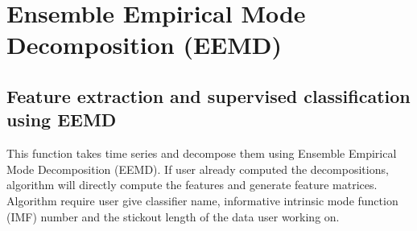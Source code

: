 \documentclass[letterpaper,10pt,english]{sphinxmanual}
\begin{document}
\begin{fulllineitems}
\begin{quote}
\begin{description}
\begin{sphinxVerbatim}[commandchars=\\\{\}]
   
                                            
\PYGZbs{}\PYGZbs{}\PYGZbs{}
\PYGZbs{}\PYGZbs{}\PYGZbs{}
\PYGZbs{}\PYGZbs{}\PYGZbs{}   
\PYGZbs{}\PYGZbs{}\PYGZbs{}
\end{sphinxVerbatim}

\end{description}\end{quote}

\end{fulllineitems}



\chapter{Ensemble Empirical Mode Decomposition (EEMD)}
\label{\detokenize{EEMD:module-EEMD_Feature_Extraction}}\label{\detokenize{EEMD:ensemble-empirical-mode-decomposition-eemd}}\label{\detokenize{EEMD::doc}}

\section{Feature extraction and supervised classification using EEMD}
\label{\detokenize{EEMD:feature-extraction-and-supervised-classification-using-eemd}}
This function takes time series and decompose them using Ensemble Empirical Mode 
Decomposition (EEMD). If user already computed the decompositions, algorithm will
directly compute the features and generate feature matrices. Algorithm require user 
give classifier name, informative intrinsic mode function (IMF) number and the stickout
length of the data user working on.
\end{document}
